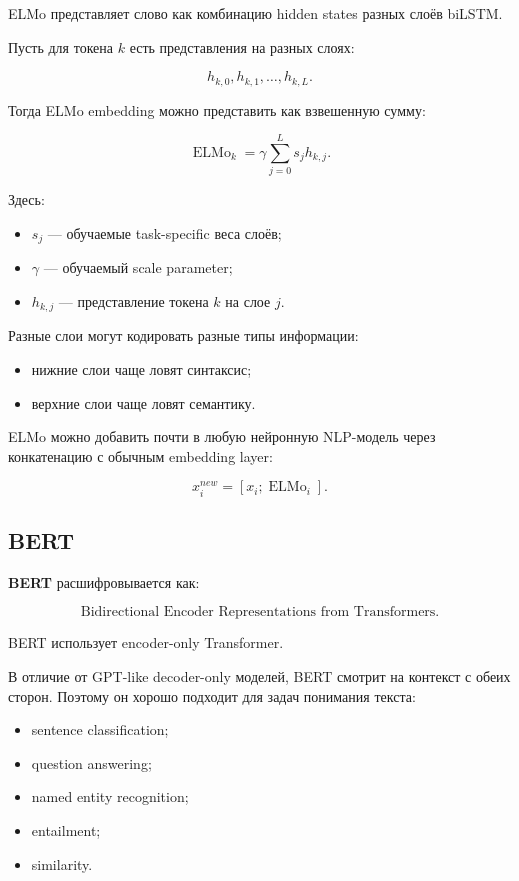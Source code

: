 \documentclass[a4paper,12pt]{article}
\begin{document}
ELMo представляет слово как комбинацию hidden states разных слоёв biLSTM.

Пусть для токена \(k\) есть представления на разных слоях:

\[
h_{k,0}, h_{k,1}, \dots, h_{k,L}.
\]

Тогда ELMo embedding можно представить как взвешенную сумму:

\[
\operatorname{ELMo}_k
=
\gamma
\sum_{j=0}^{L}
s_j h_{k,j}.
\]

Здесь:

\begin{itemize}
    \item \(s_j\) --- обучаемые task-specific веса слоёв;
    \item \(\gamma\) --- обучаемый scale parameter;
    \item \(h_{k,j}\) --- представление токена \(k\) на слое \(j\).
\end{itemize}

Разные слои могут кодировать разные типы информации:

\begin{itemize}
    \item нижние слои чаще ловят синтаксис;
    \item верхние слои чаще ловят семантику.
\end{itemize}

ELMo можно добавить почти в любую нейронную NLP-модель через конкатенацию с обычным embedding layer:

\[
x_i^{new}
=
[x_i; \operatorname{ELMo}_i].
\]

\subsection{BERT}

\textbf{BERT} расшифровывается как:

\[
\text{Bidirectional Encoder Representations from Transformers}.
\]

BERT использует encoder-only Transformer.

В отличие от GPT-like decoder-only моделей, BERT смотрит на контекст с обеих сторон. Поэтому он хорошо подходит для задач понимания текста:

\begin{itemize}
    \item sentence classification;
    \item question answering;
    \item named entity recognition;
    \item entailment;
    \item similarity.
\end{itemize}
\end{document}
